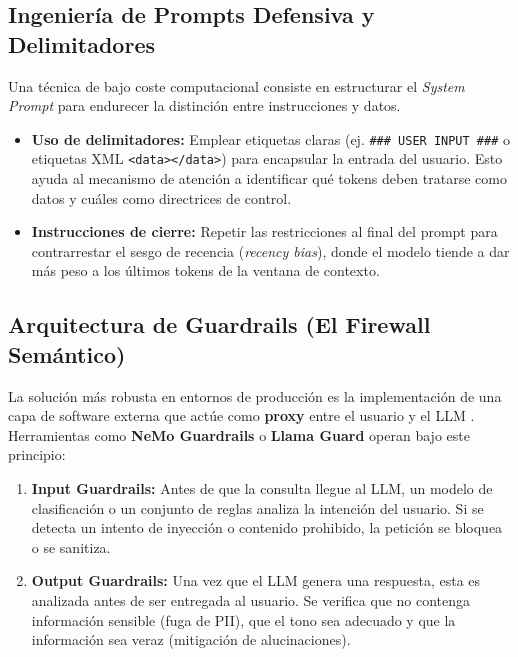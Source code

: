 \documentclass[12pt]{article}
\begin{document}
\subsection{Ingeniería de Prompts Defensiva y Delimitadores}
Una técnica de bajo coste computacional consiste en estructurar el \textit{System Prompt} para endurecer la distinción entre instrucciones y datos.
\begin{itemize}
    \item \textbf{Uso de delimitadores:} Emplear etiquetas claras (ej. \texttt{\#\#\# USER INPUT \#\#\#} o etiquetas XML \texttt{<data></data>}) para encapsular la entrada del usuario. Esto ayuda al mecanismo de atención a identificar qué tokens deben tratarse como datos y cuáles como directrices de control.
    \item \textbf{Instrucciones de cierre:} Repetir las restricciones al final del prompt para contrarrestar el sesgo de recencia (\textit{recency bias}), donde el modelo tiende a dar más peso a los últimos tokens de la ventana de contexto.
\end{itemize}

\subsection{Arquitectura de Guardrails (El Firewall Semántico)}
La solución más robusta en entornos de producción es la implementación de una capa de software externa que actúe como \textbf{proxy} entre el usuario y el LLM \parencite{reavis2024generative}. Herramientas como \textbf{NeMo Guardrails} \parencite{nvidia_nemo_guardrails} o \textbf{Llama Guard} \parencite{inan2023llama} operan bajo este principio:
\begin{enumerate}
    \item \textbf{Input Guardrails:} Antes de que la consulta llegue al LLM, un modelo de clasificación o un conjunto de reglas analiza la intención del usuario. Si se detecta un intento de inyección o contenido prohibido, la petición se bloquea o se sanitiza.
    \item \textbf{Output Guardrails:} Una vez que el LLM genera una respuesta, esta es analizada antes de ser entregada al usuario. Se verifica que no contenga información sensible (fuga de PII), que el tono sea adecuado y que la información sea veraz (mitigación de alucinaciones).
\end{enumerate}
\end{document}
